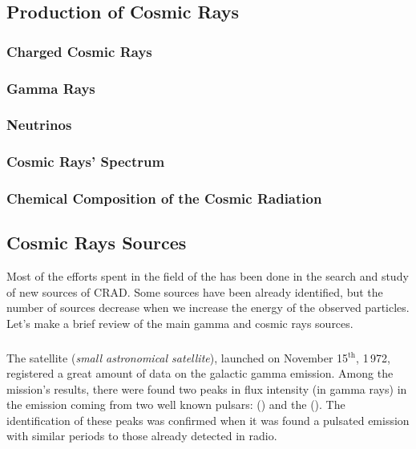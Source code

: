 \subsection{Production of Cosmic Rays}

\subsubsection{Charged Cosmic Rays}

\subsubsection{Gamma Rays}

\subsubsection{Neutrinos}

\subsubsection{Cosmic Rays' Spectrum}

\subsubsection{Chemical Composition of the Cosmic Radiation}

\subsection{Cosmic Rays Sources}

Most of the efforts spent in the field of the \emph{} has been done in the search and study of new sources of
CRAD. Some sources have been already identified, but the number of
sources decrease when we increase the energy of the observed
particles. Let's make a brief review of the main gamma and cosmic rays
sources.

\subsubsection{}

The satellite  (\emph{small astronomical satellite}),
launched on November 15$^{\mathrm{th}}$, 1\,972, registered a great
amount of data on the galactic gamma emission. Among the mission's
results, there were found two peaks in flux intensity (in gamma rays)
in the emission coming from two well known pulsars: 
() and the  (). The
identification of these peaks was confirmed when it was found a
pulsated emission with similar periods to those already detected in
radio.

